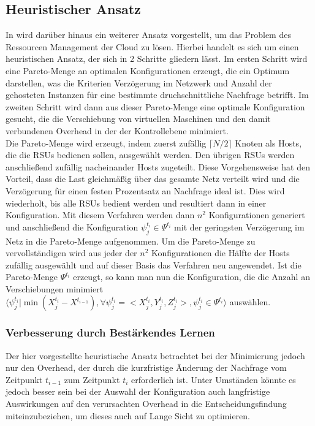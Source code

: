 \documentclass[conference]{IEEEtran}
\begin{document}
\subsection{Heuristischer Ansatz}
In \cite{IEEEhowto:orig} wird darüber hinaus ein weiterer Ansatz vorgestellt, um das Problem des Ressourcen Management der Cloud zu lösen. Hierbei handelt es sich um einen heuristischen Ansatz, der sich in 2 Schritte gliedern lässt. Im ersten Schritt wird eine Pareto-Menge an optimalen Konfigurationen erzeugt, die ein Optimum darstellen, was die Kriterien Verzögerung im Netzwerk und Anzahl der gehosteten Instanzen für eine bestimmte druchschnittliche Nachfrage betrifft. Im zweiten Schritt wird dann aus dieser Pareto-Menge eine optimale Konfiguration gesucht, die die Verschiebung von virtuellen Maschinen und den damit verbundenen Overhead in der der Kontrollebene minimiert. \\
Die Pareto-Menge wird erzeugt, indem zuerst zufällig \(\lceil N/2 \rceil\) Knoten als Hosts, die die RSUs bedienen sollen, ausgewählt werden. Den übrigen RSUs werden anschließend zufällig nacheinander Hosts zugeteilt. Diese Vorgehensweise hat den Vorteil, dass die Last gleichmäßig über das gesamte Netz verteilt wird und die Verzögerung für einen festen Prozentsatz an Nachfrage ideal ist.
Dies wird wiederholt, bis alle RSUs bedient werden und resultiert dann in einer Konfiguration.
Mit diesem Verfahren werden dann \(n^2\) Konfigurationen generiert und anschließend die Konfiguration \(\psi_j^{t_i} \in \Psi^{t_i}\) mit der geringsten Verzögerung im Netz in die Pareto-Menge aufgenommen.
Um die Pareto-Menge zu vervollständigen wird aus jeder der \(n^2\) Konfigurationen  die Hälfte der Hosts zufällig ausgewählt und auf dieser Basis das Verfahren neu angewendet. 
Ist die Pareto-Menge \(\Psi^{t_i}\) erzeugt, so kann man nun die Konfiguration, die die Anzahl an Verschiebungen minimiert \(\langle \psi_{j}^{t_i}|\min(X_{j}^{t_i}-X^{t_{i-1}}),\forall \psi_{j}^{t_i}=<X_{j}^{t_i},Y_{j}^{t_i},Z_{j}^{t_i}>, \psi_{j}^{t_i} \in \Psi^{t_i}  \rangle\) auswählen.


\subsubsection{Verbesserung durch Bestärkendes Lernen}

Der hier vorgestellte heuristische Ansatz betrachtet bei der Minimierung jedoch nur den Overhead, der durch die kurzfristige Änderung der Nachfrage vom Zeitpunkt \(t_{i-1}\) zum Zeitpunkt \(t_i\) erforderlich ist. Unter Umständen könnte es jedoch besser sein bei der Auswahl der Konfiguration auch langfristige Auswirkungen auf den verursachten Overhead in die Entscheidungsfindung miteinzubeziehen, um dieses auch auf Lange Sicht zu optimieren. 
\end{document}
